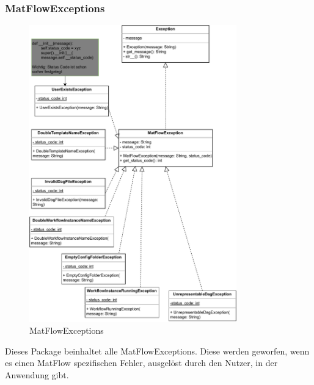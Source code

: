 \subsubsection{MatFlowExceptions}
\begin{figure}[h!]
    \includegraphics[width=0.8\textwidth]{res/Klassen/MatFlowExceptions.drawio.pdf}
    \caption{MatFlowExceptions}
\end{figure}
Dieses Package beinhaltet alle MatFlowExceptions. Diese werden geworfen, wenn es einen MatFlow spezifischen Fehler, ausgelöst 
durch den Nutzer, in der Anwendung gibt.

\FloatBarrier
\newpage